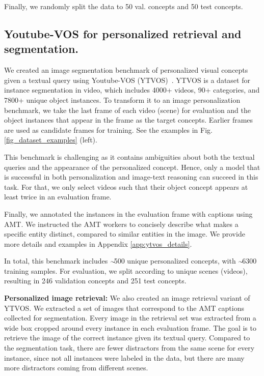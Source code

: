 \documentclass[runningheads]{llncs}
\newcommand{\tildeapprox}{{\raise.17ex\hbox{$\scriptstyle\sim$}}}
\newcommand{\figref}[1]{Fig. \ref{#1}}
\begin{document}
Finally, we randomly split the data to 50 val. concepts and 50 test concepts.

\subsection{Youtube-VOS for personalized retrieval and segmentation.}
We created an image segmentation benchmark of personalized visual concepts given a textual query using Youtube-VOS (YTVOS)~\cite{xu2018youtube}. YTVOS is a dataset for instance segmentation in video, which includes 4000+ videos, 90+ categories, and 7800+ unique object instances. To transform it to an image personalization benchmark, we take the last frame of each video (scene) for evaluation and the object instances that appear in the frame as the target concepts. Earlier frames are used as candidate frames for training. See the examples in \figref{fig_dataset_examples} (left).

This benchmark is challenging as it contains ambiguities about both the textual queries and the appearance of the personalized concept. Hence, only a model that is successful in both personalization and image-text reasoning can succeed in this task. For that, we only select videos such that their object concept appears at least twice in an evaluation frame. 

Finally, we annotated the instances in the evaluation frame with captions using AMT. We instructed the AMT workers to concisely describe what makes a specific entity distinct, compared to similar entities in the image. We provide more details and examples in Appendix \ref{app:ytvos_details}.

In total, this benchmark includes $\tildeapprox\!$500 unique personalized concepts, with $\tildeapprox\!$6300 training samples. For evaluation, we split according to unique scenes (videos), resulting in 246 validation concepts and 251 test concepts.

\textbf{Personalized image retrieval:}
We also created an image retrieval variant of YTVOS. We extracted a set of images that correspond to the AMT captions collected for segmentation. Every image in the retrieval set was extracted from a wide box cropped around every instance in each evaluation frame. The goal is to retrieve the image of the correct instance given its textual query. Compared to the segmentation task, there are fewer distractors from the same scene for every instance, since not all instances were labeled in the data, but there are many more distractors coming from different scenes.
\end{document}
